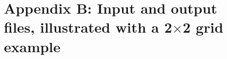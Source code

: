 \documentclass{article}
\newcommand{\code}[1]{\texttt{#1}}
\begin{document}
%
%
%
%
%		
%

\section*{Appendix B: Input and output files, illustrated with a 2$\times$2 grid example}
\end{document}
